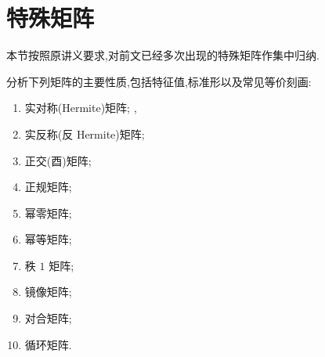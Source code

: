 \newpage

\section{特殊矩阵}

本节按照原讲义要求,对前文已经多次出现的特殊矩阵作集中归纳.

\begin{example}[\marktwostar]
分析下列矩阵的主要性质,包括特征值,标准形以及常见等价刻画:
\begin{enumerate}
    \item 实对称(Hermite)矩阵;
,    \item 实反称(反 Hermite)矩阵;
    \item 正交(酉)矩阵;
    \item 正规矩阵;
    \item 幂零矩阵;
    \item 幂等矩阵;
    \item 秩 $1$ 矩阵;
    \item 镜像矩阵;
    \item 对合矩阵;
    \item 循环矩阵.
\end{enumerate}
\end{example}
\exampleblank

